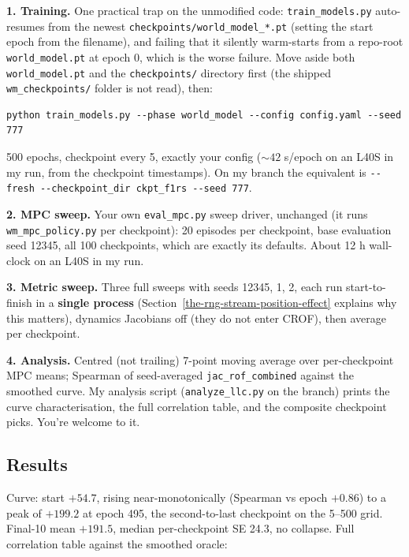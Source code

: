 \documentclass[11pt]{article}
\begin{document}
\textbf{1. Training.} One practical trap on the unmodified code:
\texttt{train\_models.py} auto-resumes from the newest
\texttt{checkpoints/world\_model\_*.pt} (setting the start epoch from
the filename), and failing that it silently warm-starts from a repo-root
\texttt{world\_model.pt} at epoch 0, which is the worse failure. Move
aside both \texttt{world\_model.pt} and the \texttt{checkpoints/}
directory first (the shipped \texttt{wm\_checkpoints/} folder is not
read), then:

\begin{verbatim}
python train_models.py --phase world_model --config config.yaml --seed 777
\end{verbatim}

500 epochs, checkpoint every 5, exactly your config (\(\sim 42\) s/epoch
on an L40S in my run, from the checkpoint timestamps). On my branch the equivalent is
\texttt{-\/-fresh\ -\/-checkpoint\_dir\ ckpt\_f1rs\ -\/-seed\ 777}.

\textbf{2. MPC sweep.} Your own \texttt{eval\_mpc.py} sweep driver,
unchanged (it runs \texttt{wm\_mpc\_policy.py} per checkpoint): 20
episodes per checkpoint, base evaluation seed 12345, all 100
checkpoints, which are exactly its defaults. About 12 h wall-clock on an
L40S in my run.

\textbf{3. Metric sweep.} Three full sweeps with seeds 12345, 1, 2, each
run start-to-finish in a \textbf{single process}
(Section~\ref{the-rng-stream-position-effect} explains why this
matters), dynamics Jacobians off (they do not enter CROF), then
average per checkpoint. 

\textbf{4. Analysis.} Centred (not trailing) 7-point moving average over
per-checkpoint MPC means; Spearman of seed-averaged
\texttt{jac\_rof\_combined} against the smoothed curve. My analysis
script (\texttt{analyze\_llc.py} on the branch) prints the curve
characterisation, the full correlation table, and the composite
checkpoint picks. You're welcome to it.

\subsection{Results}\label{what-i-observed-the-numbers-to-compare-against}

Curve: start \(+54.7\), rising near-monotonically (Spearman vs epoch
\(+0.86\)) to a peak of \(+199.2\) at epoch 495, the second-to-last
checkpoint on the 5--500 grid. Final-10 mean \(+191.5\), median
per-checkpoint SE 24.3, no collapse. Full correlation table against the
smoothed oracle:
\end{document}
